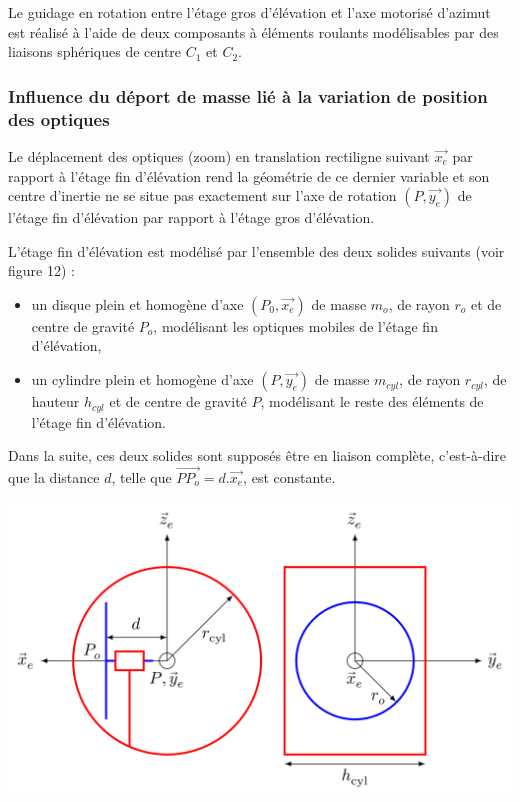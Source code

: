 Le guidage en rotation entre l'étage gros d'élévation et l'axe motorisé d'azimut est réalisé à l'aide de deux composants à éléments roulants modélisables par des liaisons sphériques de centre $C_1$ et $C_2$.


\subsubsection{Influence du déport de masse lié à la variation de position des optiques}

Le déplacement des optiques (zoom) en translation rectiligne suivant $\overrightarrow{x_e}$ par rapport à l'étage fin d'élévation rend la géométrie de ce dernier variable et son centre d'inertie ne se situe pas exactement sur l'axe de rotation $(P,\overrightarrow{y_e})$ de l'étage fin d'élévation par rapport à l'étage gros d'élévation.

L'étage fin d'élévation est modélisé par l'ensemble des deux solides suivants (voir figure 12) :
\begin{itemize}
 \item un disque plein et homogène d'axe $(P_0,\overrightarrow{x_e})$ de masse $m_o$, de rayon $r_o$ et de centre de gravité $P_o$, modélisant les optiques mobiles de l'étage fin d'élévation,
 \item un cylindre plein et homogène d'axe $(P,\overrightarrow{y_e})$ de masse $m_{cyl}$, de rayon $r_{cyl}$, de hauteur $h_{cyl}$ et de centre de gravité $P$, modélisant le reste des éléments de l'étage fin d'élévation.
\end{itemize}

Dans la suite, ces deux solides sont supposés être en liaison complète, c'est-à-dire que la distance $d$, telle que $\overrightarrow{PP_o}=d.\overrightarrow{x_e}$, est constante.

\begin{center}
\includegraphics[width=0.7\linewidth]{img/fig11}
\end{center}


